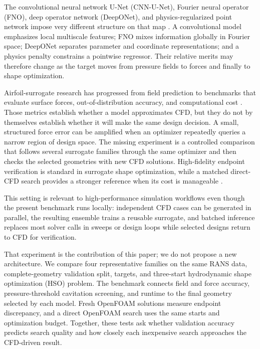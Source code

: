 \documentclass[conference]{IEEEtran}
\begin{document}
The convolutional neural network U-Net (CNN-U-Net), Fourier neural operator
(FNO), deep operator network (DeepONet), and physics-regularized point network
impose very different structure on that map
\cite{ronneberger2015unet,li2021fno,lu2021deeponet,raissi2019pinn}. A
convolutional model emphasizes local multiscale features; FNO mixes information
globally in Fourier space; DeepONet separates parameter and coordinate
representations; and a physics penalty constrains a pointwise regressor. Their
relative merits may therefore change as the target moves from pressure fields
to forces and finally to shape optimization.

Airfoil-surrogate research has progressed from field prediction
\cite{guo2016steady,bhatnagar2019aerodynamic,sekar2019airfoils,thuerey2020rans}
to benchmarks that evaluate surface forces, out-of-distribution accuracy, and
computational cost \cite{bonnet2022airfrans,li2023gino,yagoubi2025ml4cfd}.
Those metrics establish whether a model approximates CFD, but they do not by
themselves establish whether it will make the same design decision. A small,
structured force error can be amplified when an optimizer repeatedly queries a
narrow region of design space. The missing experiment is a controlled
comparison that follows several surrogate families through the same optimizer
and then checks the selected geometries with new CFD solutions. High-fidelity
endpoint verification is standard in surrogate shape optimization, while a matched direct-CFD
search provides a stronger reference when its cost is manageable
\cite{li2022mlaso,shukla2023operators}.

This setting is relevant to high-performance simulation workflows even though
the present benchmark runs locally: independent CFD cases can be generated in
parallel, the resulting ensemble trains a reusable surrogate, and batched
inference replaces most solver calls in sweeps or design loops while selected
designs return to CFD for verification.

That experiment is the contribution of this paper; we do not propose a new
architecture. We compare four representative families on the same RANS data,
complete-geometry validation split, targets, and three-start hydrodynamic shape
optimization (HSO) problem. The
benchmark connects field and force accuracy, pressure-threshold cavitation
screening, and runtime to the final geometry selected by each model. Fresh
OpenFOAM solutions measure endpoint discrepancy, and a direct OpenFOAM search
uses the same starts and optimization budget. Together, these tests ask whether
validation accuracy predicts search quality and how closely each inexpensive
search approaches the CFD-driven result.
\end{document}
